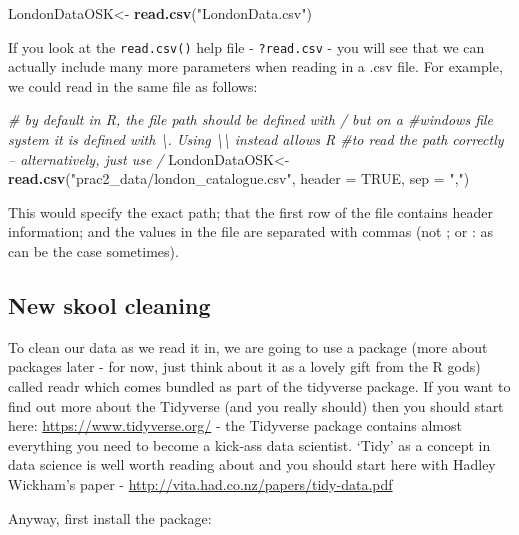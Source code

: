 \documentclass[]{book}
\newenvironment{Shaded}{\begin{snugshade}}{\end{snugshade}}
\newcommand{\CommentTok}[1]{\textcolor[rgb]{0.56,0.35,0.01}{\textit{#1}}}
\newcommand{\DataTypeTok}[1]{\textcolor[rgb]{0.13,0.29,0.53}{#1}}
\newcommand{\KeywordTok}[1]{\textcolor[rgb]{0.13,0.29,0.53}{\textbf{#1}}}
\newcommand{\NormalTok}[1]{#1}
\newcommand{\OtherTok}[1]{\textcolor[rgb]{0.56,0.35,0.01}{#1}}
\newcommand{\StringTok}[1]{\textcolor[rgb]{0.31,0.60,0.02}{#1}}
\begin{document}
\begin{Shaded}
\begin{Highlighting}[]
\NormalTok{LondonDataOSK<-}\StringTok{ }\KeywordTok{read.csv}\NormalTok{(}\StringTok{"LondonData.csv"}\NormalTok{)}
\end{Highlighting}
\end{Shaded}

If you look at the \texttt{read.csv()} help file - \texttt{?read.csv} - you will see that we can actually include many more parameters when reading in a .csv file. For example, we could read in the same file as follows:

\begin{Shaded}
\begin{Highlighting}[]
\CommentTok{# by default in R, the file path should be defined with / but on a #windows file system it is defined with \textbackslash{}. Using \textbackslash{}\textbackslash{} instead allows R #to read the path correctly – alternatively, just use /}
\NormalTok{LondonDataOSK<-}\StringTok{ }\KeywordTok{read.csv}\NormalTok{(}\StringTok{"prac2_data/london_catalogue.csv"}\NormalTok{, }\DataTypeTok{header =} \OtherTok{TRUE}\NormalTok{, }\DataTypeTok{sep =} \StringTok{","}\NormalTok{)}
\end{Highlighting}
\end{Shaded}

This would specify the exact path; that the first row of the file contains header information; and the values in the file are separated with commas (not ; or : as can be the case sometimes).

\hypertarget{new-skool-cleaning}{%
\subsection{New skool cleaning}\label{new-skool-cleaning}}

To clean our data as we read it in, we are going to use a package (more about packages later - for now, just think about it as a lovely gift from the R gods) called readr which comes bundled as part of the tidyverse package. If you want to find out more about the Tidyverse (and you really should) then you should start here: \url{https://www.tidyverse.org/} - the Tidyverse package contains almost everything you need to become a kick-ass data scientist. `Tidy' as a concept in data science is well worth reading about and you should start here with Hadley Wickham's paper - \url{http://vita.had.co.nz/papers/tidy-data.pdf}

Anyway, first install the package:
\end{document}
